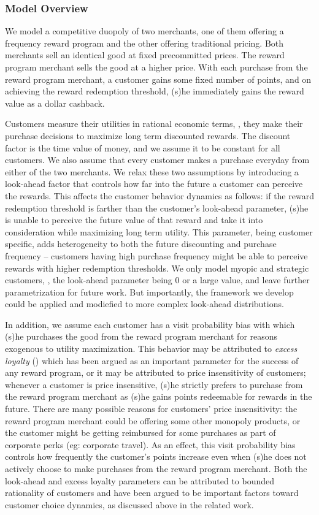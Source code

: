 \subsubsection{Model Overview}
We model a competitive duopoly of two merchants, one of them offering a frequency reward program and the other offering traditional pricing.
Both merchants sell an identical good at fixed precommitted prices.
The reward program merchant sells the good at a higher price.
With each purchase from the reward program merchant, a customer gains some fixed number of points, and on achieving the reward redemption threshold, (s)he immediately gains the reward value as a dollar cashback.

Customers measure their utilities in rational economic terms, \ie, they make their purchase decisions to maximize long term discounted rewards.
The discount factor is the time value of money, and we assume it to be constant for all customers.
We also assume that every customer makes a purchase everyday from either of the two merchants.
We relax these two assumptions by introducing a look-ahead factor that controls how far into the future a customer can perceive the rewards. 
This affects the customer behavior dynamics as follows: if the reward redemption threshold is farther than the customer's look-ahead parameter, (s)he is unable to perceive the future value of that reward and take it into consideration while maximizing long term utility.
This parameter, being customer specific, adds heterogeneity to both the future discounting and purchase frequency -- customers having high purchase frequency might be able to perceive rewards with higher redemption thresholds.
We only model myopic and strategic customers, \ie, the look-ahead parameter being $0$ or a large value, and leave further parametrization for future work. But importantly, the framework we develop could be applied and modiefied to more complex look-ahead distributions.

In addition, we assume each customer has a visit probability bias with which (s)he purchases the good from the reward program merchant for reasons exogenous to utility maximization.
This behavior may be attributed to \emph{excess loyalty} (\cite{fader1993excess, sharp1997loyalty}) which has been argued as an important parameter for the success of any reward program, or it may be attributed to price insensitivity of customers; whenever a customer is price insensitive, (s)he strictly prefers to purchase from the reward program merchant as (s)he gains points redeemable for rewards in the future.
There are many possible reasons for customers' price insensitivity: the reward program merchant could be offering some other monopoly products, or the customer might be getting reimbursed for some purchases as part of corporate perks (eg: corporate travel).
As an effect, this visit probability bias controls how frequently the customer's points increase even when (s)he does not actively choose to make purchases from the reward program merchant.
Both the look-ahead and excess loyalty parameters can be attributed to bounded rationality of customers and have been argued to be important factors toward customer choice dynamics, as discussed above in the related work.


